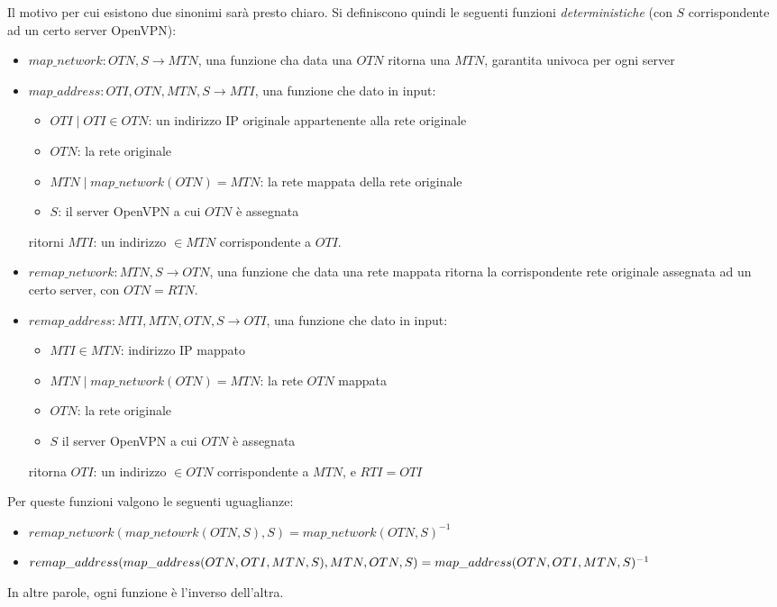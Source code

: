 Il motivo per cui esistono due sinonimi sarà presto chiaro. Si definiscono quindi
le seguenti funzioni \textit{deterministiche} (con $S$ corrispondente ad un certo
server OpenVPN):
\begin{itemize}
  \item $map\_network: OTN, S \rightarrow MTN$, una funzione cha data una
  $OTN$ ritorna una $MTN$, garantita univoca per ogni server
  \item $map\_address: OTI, OTN, MTN, S \rightarrow MTI$,
  una funzione che dato in input:
  \begin{itemize}
    \item $OTI \mid OTI \in OTN$: un indirizzo IP originale appartenente alla
    rete originale
    \item $OTN$: la rete originale
    \item $MTN \mid map\_network(OTN)=MTN$: la rete mappata della rete originale
    \item $S$: il server OpenVPN a cui $OTN$ è assegnata
  \end{itemize}
  ritorni $MTI$: un indirizzo $\in MTN$ corrispondente a $OTI$.
  \item $remap\_network: MTN, S \rightarrow OTN$, una funzione che data una rete
  mappata ritorna la corrispondente rete originale assegnata ad un certo server,
  con $OTN=RTN$.
  \item $remap\_address: MTI, MTN, OTN, S \rightarrow OTI$, una funzione che dato
  in input:
  \begin{itemize}
    \item $MTI \in MTN$: indirizzo IP mappato
    \item $MTN \mid map\_network(OTN)=MTN$: la rete $OTN$ mappata
    \item $OTN$: la rete originale
    \item $S$  il server OpenVPN a cui $OTN$ è assegnata
  \end{itemize}
  ritorna $OTI$: un indirizzo $\in OTN$ corrispondente a $MTN$, e $RTI=OTI$
\end{itemize}
Per queste funzioni valgono le seguenti uguaglianze:
\begin{itemize}
  \item $remap\_network(map\_netowrk(OTN, S), S)=map\_network(OTN, S)^{-1}$
  \item
  $remap\_address(map\_address(OTN, OTI, MTN, S), MTN, OTN, S)=\\
    map\_address(OTN, OTI, MTN, S)^{-1}$
\end{itemize}
In altre parole, ogni funzione è l'inverso dell'altra.\\
